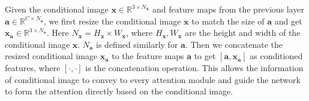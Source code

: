 Given the conditional image $\bm{x}\in \mathbb{R}^{3\times N_{\bm{x}}}$ and feature maps from the previous layer $\bm{a}\in \mathbb{R}^{C\times N_{\bm{a}}}$, we first resize the conditional image $\bm{x}$ to match the size of $\bm{a}$ and get $\bm{x}_{\bm{a}}\in \mathbb{R}^{3\times N_{\bm{a}}}$. Here $N_{\bm{x}}=H_{\bm{x}}\times W_{\bm{x}}$, where $H_{\bm{x}}, W_{\bm{x}}$ are the height and width of the conditional image $\bm{x}$. $N_{\bm{a}}$ is defined similarly for $\bm{a}$.
Then we concatenate the resized conditional image $\bm{x}_{\bm{a}}$ to the feature maps $\bm{a}$ to get $[\bm{a}, \bm{x}_{\bm{a}}]$ as conditioned features, where $[\cdot,\cdot]$ is the concatenation operation. This allows the information of conditional image to convey to every attention module and guide the network to form the attention directly based on the conditional image.
%

